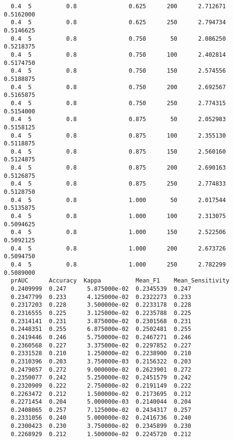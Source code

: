 \documentclass[
  letterpaper,
  DIV=11,
  numbers=noendperiod]{scrartcl}
\begin{document}
\begin{verbatim}
  0.4  5          0.8               0.625      200      2.712671  0.5162000
  0.4  5          0.8               0.625      250      2.794734  0.5146625
  0.4  5          0.8               0.750       50      2.086250  0.5218375
  0.4  5          0.8               0.750      100      2.402814  0.5174750
  0.4  5          0.8               0.750      150      2.574556  0.5188875
  0.4  5          0.8               0.750      200      2.692567  0.5165875
  0.4  5          0.8               0.750      250      2.774315  0.5154000
  0.4  5          0.8               0.875       50      2.052983  0.5158125
  0.4  5          0.8               0.875      100      2.355130  0.5118875
  0.4  5          0.8               0.875      150      2.560160  0.5124875
  0.4  5          0.8               0.875      200      2.690163  0.5126875
  0.4  5          0.8               0.875      250      2.774833  0.5128750
  0.4  5          0.8               1.000       50      2.017544  0.5135875
  0.4  5          0.8               1.000      100      2.313075  0.5094625
  0.4  5          0.8               1.000      150      2.522506  0.5092125
  0.4  5          0.8               1.000      200      2.673726  0.5094750
  0.4  5          0.8               1.000      250      2.782299  0.5089000
  prAUC      Accuracy  Kappa          Mean_F1    Mean_Sensitivity
  0.2409999  0.247      5.875000e-02  0.2345539  0.247           
  0.2347799  0.233      4.125000e-02  0.2322273  0.233           
  0.2317203  0.228      3.500000e-02  0.2233178  0.228           
  0.2316555  0.225      3.125000e-02  0.2235788  0.225           
  0.2314141  0.231      3.875000e-02  0.2301568  0.231           
  0.2448351  0.255      6.875000e-02  0.2502481  0.255           
  0.2419446  0.246      5.750000e-02  0.2467271  0.246           
  0.2360568  0.227      3.375000e-02  0.2297852  0.227           
  0.2331528  0.210      1.250000e-02  0.2238900  0.210           
  0.2310396  0.203      3.750000e-03  0.2156322  0.203           
  0.2479057  0.272      9.000000e-02  0.2623901  0.272           
  0.2350077  0.242      5.250000e-02  0.2451579  0.242           
  0.2320909  0.222      2.750000e-02  0.2191149  0.222           
  0.2263472  0.212      1.500000e-02  0.2173695  0.212           
  0.2271454  0.204      5.000000e-03  0.2140044  0.204           
  0.2408065  0.257      7.125000e-02  0.2434317  0.257           
  0.2331056  0.240      5.000000e-02  0.2416736  0.240           
  0.2300423  0.230      3.750000e-02  0.2345899  0.230           
  0.2268929  0.212      1.500000e-02  0.2245720  0.212           

\end{verbatim}
\end{document}
